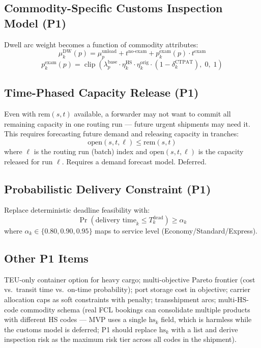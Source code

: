 \documentclass[11pt,a4paper]{article}
\theoremstyle{definition}
\begin{document}
\subsection{Commodity-Specific Customs Inspection Model (P1)}

Dwell arc weight becomes a function of commodity attributes:
\[
  \mu_k^{\text{DW}}(p) = \mu_p^{\text{unload}} + t^{\text{no-exam}}
    + p_k^{\text{exam}}(p) \cdot t^{\text{exam}}
\]
\[
  p_k^{\text{exam}}(p) = \operatorname{clip}\!\left(
    \lambda_p^{\text{base}} \cdot \eta_k^{\text{HS}} \cdot \eta_k^{\text{orig}} \cdot (1 - \delta_k^{\text{CTPAT}}),\; 0,\; 1
  \right)
\]

\subsection{Time-Phased Capacity Release (P1)}

Even with $\text{rem}(s,t)$ available, a forwarder may not want to commit all remaining
capacity in one routing run — future urgent shipments may need it. This requires
forecasting future demand and releasing capacity in tranches:
\[
  \text{open}(s,t,\ell) \leq \text{rem}(s,t)
\]
where $\ell$ is the routing run (batch) index and $\text{open}(s,t,\ell)$ is the capacity
released for run $\ell$. Requires a demand forecast model. Deferred.

\subsection{Probabilistic Delivery Constraint (P1)}

Replace deterministic deadline feasibility with:
\[
  \Pr\!\left(\text{delivery time}_k \leq T_k^{\text{dead}}\right) \geq \alpha_k
\]
where $\alpha_k \in \{0.80, 0.90, 0.95\}$ maps to service level (Economy/Standard/Express).

\subsection{Other P1 Items}

TEU-only container option for heavy cargo; multi-objective Pareto frontier (cost vs.\ transit time vs.\ on-time probability); port storage cost in objective; carrier allocation caps as soft constraints with penalty; transshipment arcs; multi-HS-code commodity schema (real FCL bookings can consolidate multiple products with different HS codes --- MVP uses a single $\text{hs}_k$ field, which is harmless while the customs model is deferred; P1 should replace $\text{hs}_k$ with a list and derive inspection risk as the maximum risk tier across all codes in the shipment).
\end{document}
